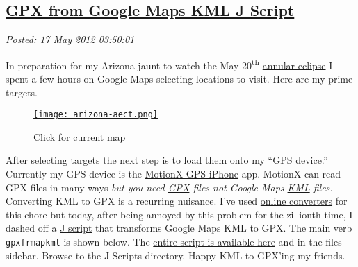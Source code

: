 %

\subsection*{\href{http://bakerjd99.wordpress.com/2012/05/16/gpx-from-google-maps-kml-j-script/}{GPX from Google Maps KML J Script}}


\noindent\emph{Posted: 17 May 2012 03:50:01}
\vspace{6pt}

In preparation for my Arizona jaunt to watch the May
20\textsuperscript{th}
\href{http://eclipse-maps.com/Eclipse-Maps/Gallery/Pages/Annular\_solar\_eclipse\_of\_2012\_May\_20.html}{annular
eclipse} I spent a few hours on Google Maps selecting locations to
visit. Here are my prime targets.

\captionsetup[figure]{labelformat=empty}
\begin{figure}[htbp]
\centering
\href{http://maps.google.com/maps/ms?msid=213851645709730088342.0004bd67c9be9e39b4797&msa=0}{\texttt{[image: arizona-aect.png]}}
\caption{Click for current map}
\label{fig:119X0}
\end{figure}


After selecting targets the next step is to load them onto my ``GPS
device.'' Currently my GPS device is the
\href{http://gps.motionx.com/iphone/overview/}{MotionX GPS iPhone} app.
MotionX can read GPX files in many ways \emph{but you need
\href{http://www.topografix.com/gpx.asp}{GPX} files not Google Maps
\href{https://developers.google.com/kml/documentation/}{KML} files.}
Converting KML to GPX is a recurring nuisance. I've used
\href{http://kml2gpx.com/}{online converters} for this chore but today,
after being annoyed by this problem for the zillionth time, I dashed off
a \href{http://www.jsoftware.com/jwiki/FrontPage}{J script} that
transforms Google Maps KML to GPX. The main verb \texttt{gpxfrmapkml} is
shown below. The
\href{https://www.box.com/s/09dc770e4821500d222b}{entire script is
available here} and in the files sidebar. Browse to the J Scripts
directory. Happy KML to GPX'ing my friends.

